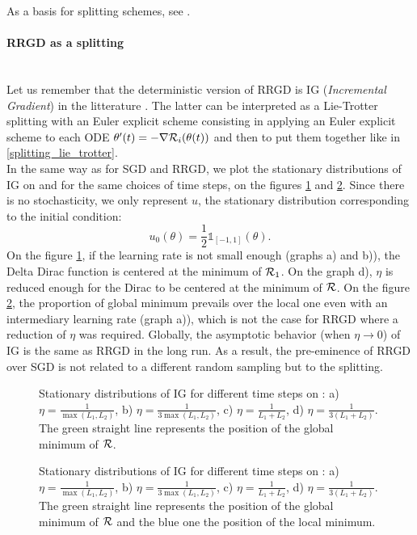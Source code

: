 As a basis for splitting schemes, see \cite{splitting_ode_review,splitting_ode_review2}.

\paragraph{RRGD as a splitting}
~~\\
Let us remember that the deterministic version of RRGD is IG ({\it Incremental Gradient}) in the litterature \cite{IG_proximal}. The latter can be interpreted as a Lie-Trotter
splitting with an Euler explicit scheme consisting in applying an Euler explicit scheme to each ODE $\theta'(t)=-\nabla \mathcal{R}_i(\theta(t))$ and then to put them together like in \eqref{splitting_lie_trotter}. \\
In the same way as for SGD and RRGD, we plot the stationary distributions of IG on \exOne and \exTwo for the same choices of time steps, on the figures \ref{IG_ex1} and \ref{IG_ex2}. Since there is no stochasticity, we only represent $u$, the stationary distribution corresponding to the initial condition:
\begin{equation*}
	u_0(\theta) = \frac{1}{2} \mathds{1}_{[-1,1]}(\theta).
\end{equation*}
On the figure \ref{IG_ex1}, if the learning rate is not small enough (graphs a) and b)), the Delta Dirac function is centered at the minimum of $\mathcal{R}_1$. On the graph d), $\eta$ is reduced enough for the Dirac to be centered at the minimum of $\mathcal{R}$. On the figure \ref{IG_ex2}, the proportion of global minimum prevails over the local one even with an intermediary learning rate (graph a)), which is not the case for RRGD where a reduction of $\eta$ was required. Globally, the asymptotic behavior (when $\eta \to 0$) of IG is the same as RRGD in the long run. As a result, the pre-eminence of RRGD over SGD is not related to a different random sampling but to the splitting.

\begin{figure}[h!]
	\centering
	\scalebox{0.45}{}
	\caption{Stationary distributions of IG for different time steps on \exOne: a) $\eta=\frac{1}{\max(L_1,L_2)}$, b) $\eta=\frac{1}{3\max(L_1,L_2)}$, c) $\eta=\frac{1}{L_1+L_2}$, d) $\eta=\frac{1}{3(L_1+L_2)}$. The green straight line represents the position of the global minimum of $\mathcal{R}$.}
	\label{IG_ex1}
\end{figure}

\begin{figure}[h!]
	\centering
	\scalebox{0.45}{}
	\caption{Stationary distributions of IG for different time steps on \exTwo: a) $\eta=\frac{1}{\max(L_1,L_2)}$, b) $\eta=\frac{1}{3\max(L_1,L_2)}$, c) $\eta=\frac{1}{L_1+L_2}$, d) $\eta=\frac{1}{3(L_1+L_2)}$. The green straight line represents the position of the global minimum of $\mathcal{R}$ and the blue one the position of the local minimum.}
	\label{IG_ex2}
\end{figure}

